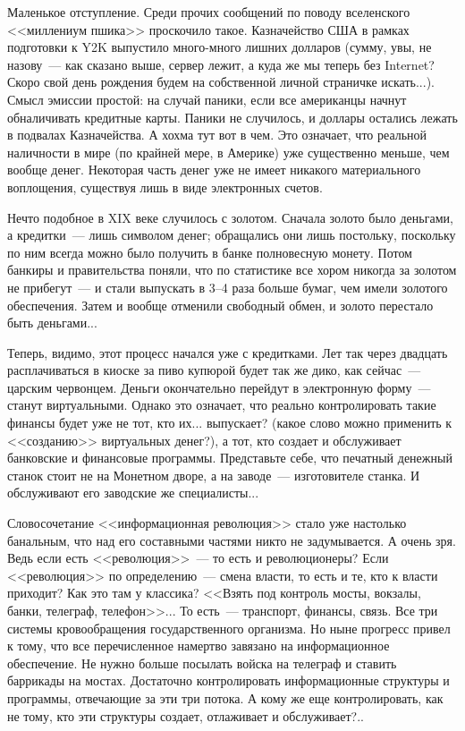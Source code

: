 \documentclass{scrbook}
\newcommand{\flqq}{<<}
\newcommand{\frqq}{>>}
\newcommand{\mdash}{~--- }
\newcommand{\ndash}{--}
\begin{document}
Маленькое отступление. Среди прочих сообщений по поводу вселенского {\flqq}миллениум пшика{\frqq} проскочило такое. Казначейство США в рамках подготовки к Y2K выпустило много-много лишних долларов (сумму, увы, не назову{\mdash}как сказано выше, сервер лежит, а куда же мы теперь без Internet? Скоро свой день рождения будем на собственной личной страничке искать...). Смысл эмиссии простой: на случай паники, если все американцы начнут обналичивать кредитные карты. Паники не случилось, и доллары остались лежать в подвалах Казначейства. А хохма тут вот в чем. Это означает, что реальной наличности в мире (по крайней мере, в Америке) уже существенно меньше, чем вообще денег. Некоторая часть денег уже не имеет никакого материального воплощения, существуя лишь в виде электронных счетов.

Нечто подобное в XIX веке случилось с золотом. Сначала золото было деньгами, а кредитки{\mdash}лишь символом денег; обращались они лишь постольку, поскольку по ним всегда можно было получить в банке полновесную монету. Потом банкиры и правительства поняли, что по статистике все хором никогда за золотом не прибегут{\mdash}и стали выпускать в 3{\ndash}4 раза больше бумаг, чем имели золотого обеспечения. Затем и вообще отменили свободный обмен, и золото перестало быть деньгами...

Теперь, видимо, этот процесс начался уже с кредитками. Лет так через двадцать расплачиваться в киоске за пиво купюрой будет так же дико, как сейчас{\mdash}царским червонцем. Деньги окончательно перейдут в электронную форму{\mdash}станут виртуальными. Однако это означает, что реально контролировать такие финансы будет уже не тот, кто их... выпускает? (какое слово можно применить к {\flqq}созданию{\frqq} виртуальных денег?), а тот, кто создает и обслуживает банковские и финансовые программы. Представьте себе, что печатный денежный станок стоит не на Монетном дворе, а на заводе{\mdash}изготовителе станка. И обслуживают его заводские же специалисты...

Словосочетание {\flqq}информационная революция{\frqq} стало уже настолько банальным, что над его составными частями никто не задумывается. А очень зря. Ведь если есть {\flqq}революция{\frqq}{\mdash}то есть и революционеры? Если {\flqq}революция{\frqq} по определению{\mdash}смена власти, то есть и те, кто к власти приходит? Как это там у классика? {\flqq}Взять под контроль мосты, вокзалы, банки, телеграф, телефон{\frqq}... То есть{\mdash}транспорт, финансы, связь. Все три системы кровообращения государственного организма. Но ныне прогресс привел к тому, что все перечисленное намертво завязано на информационное обеспечение. Не нужно больше посылать войска на телеграф и ставить баррикады на мостах. Достаточно контролировать информационные структуры и программы, отвечающие за эти три потока. А кому же еще контролировать, как не тому, кто эти структуры создает, отлаживает и обслуживает?..
\end{document}
